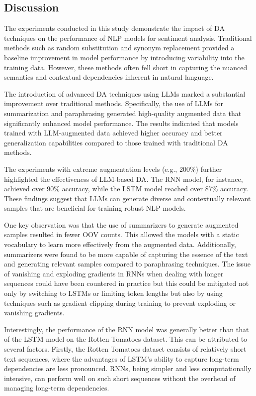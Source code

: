 \documentclass[10pt]{extarticle}
\begin{document}
\subsection{Discussion}

The experiments conducted in this study demonstrate the impact of DA techniques
on the performance of NLP models for sentiment analysis. Traditional methods
such as random substitution and synonym replacement provided a baseline
improvement in model performance by introducing variability into the training
data. However, these methods often fell short in capturing the nuanced
semantics and contextual dependencies inherent in natural language.

The introduction of advanced DA techniques using LLMs marked a substantial
improvement over traditional methods. Specifically, the use of LLMs for
summarization and paraphrasing generated high-quality augmented data that
significantly enhanced model performance. The results indicated that models
trained with LLM-augmented data achieved higher accuracy and better
generalization capabilities compared to those trained with traditional DA
methods.

The experiments with extreme augmentation levels (e.g., 200\%) further
highlighted the effectiveness of LLM-based DA. The RNN model, for instance,
achieved over 90\% accuracy, while the LSTM model reached over 87\% accuracy.
These findings suggest that LLMs can generate diverse and contextually relevant
samples that are beneficial for training robust NLP models.

One key observation was that the use of summarizers to generate augmented
samples resulted in fewer OOV counts. This allowed the models with a static
vocabulary to learn more effectively from the augmented data. Additionally,
summarizers were found to be more capable of capturing the essence of the text
and generating relevant samples compared to paraphrasing techniques. The issue
of vanishing and exploding gradients in RNNs when dealing with longer sequences
could have been countered in practice but this could be mitigated not only by
switching to LSTMs or limiting token lengths but also by using techniques such
as gradient clipping during training to prevent exploding or vanishing
gradients.

Interestingly, the performance of the RNN model was generally better than that
of the LSTM model on the Rotten Tomatoes dataset. This can be attributed to
several factors. Firstly, the Rotten Tomatoes dataset consists of relatively
short text sequences, where the advantages of LSTM's ability to capture
long-term dependencies are less pronounced. RNNs, being simpler and less
computationally intensive, can perform well on such short sequences without the
overhead of managing long-term dependencies.
\end{document}
